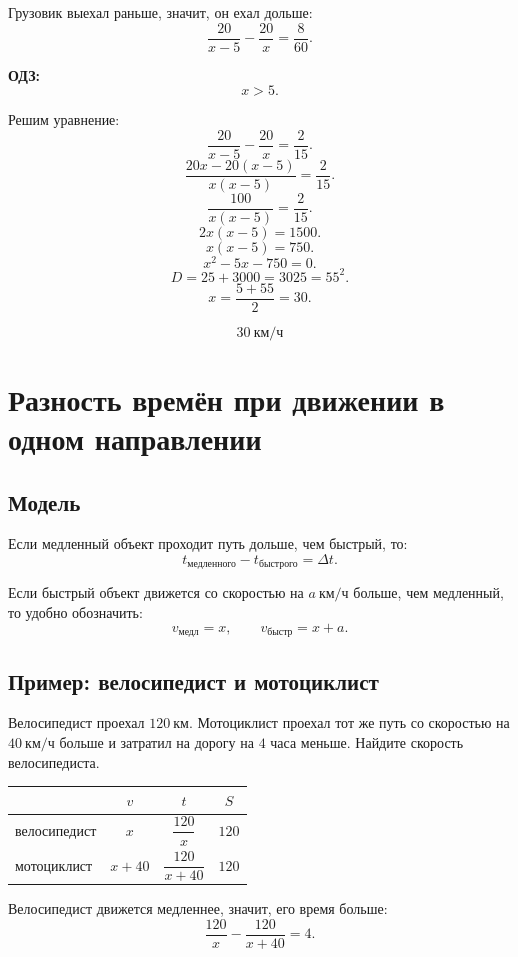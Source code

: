\documentclass[a4paper,12pt]{article}
\newcommand{\important}[1]{\textcolor{darkaccent}{\textbf{#1}}}
\newcommand{\kmh}{\text{км/ч}}
\newcommand{\km}{\text{км}}
\begin{document}
Грузовик выехал раньше, значит, он ехал дольше:
\[
\frac{20}{x-5}-\frac{20}{x}=\frac{8}{60}.
\]

\important{ОДЗ:}
\[
x>5.
\]

Решим уравнение:
\[
\frac{20}{x-5}-\frac{20}{x}=\frac{2}{15}.
\]
\[
\frac{20x-20(x-5)}{x(x-5)}=\frac{2}{15}.
\]
\[
\frac{100}{x(x-5)}=\frac{2}{15}.
\]
\[
2x(x-5)=1500.
\]
\[
x(x-5)=750.
\]
\[
x^2-5x-750=0.
\]
\[
D=25+3000=3025=55^2.
\]
\[
x=\frac{5+55}{2}=30.
\]

\[
\boxed{30\ \kmh}
\]

\section{Разность времён при движении в одном направлении}

\subsection{Модель}

Если медленный объект проходит путь дольше, чем быстрый, то:
\[
t_{\text{медленного}}-t_{\text{быстрого}}=\Delta t.
\]

Если быстрый объект движется со скоростью на $a\ \kmh$ больше, чем медленный, то удобно обозначить:
\[
v_{\text{медл}}=x, \qquad v_{\text{быстр}}=x+a.
\]

\subsection{Пример: велосипедист и мотоциклист}

Велосипедист проехал $120\ \km$. Мотоциклист проехал тот же путь со скоростью на $40\ \kmh$ больше и затратил на дорогу на $4$ часа меньше. Найдите скорость велосипедиста.

\begin{center}
\renewcommand{\arraystretch}{1.35}
\begin{tabularx}{0.82\linewidth}{X c c c}
\toprule
 & $v$ & $t$ & $S$ \\
\midrule
велосипедист & $x$ & $\dfrac{120}{x}$ & $120$ \\
мотоциклист & $x+40$ & $\dfrac{120}{x+40}$ & $120$ \\
\bottomrule
\end{tabularx}
\end{center}

Велосипедист движется медленнее, значит, его время больше:
\[
\frac{120}{x}-\frac{120}{x+40}=4.
\]
\end{document}
